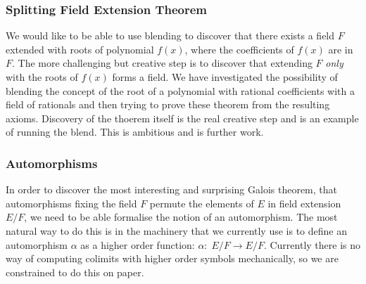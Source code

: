 \subsubsection{Splitting Field Extension Theorem}

We would like to be able to use blending to discover that there exists a
field $F$ extended with roots of polynomial $f(x)$, where the coefficients of $f(x)$ are in $F$. The more challenging but creative step is to discover that extending $F$ {\em only} with the roots of $f(x)$ forms a field. We have investigated the possibility of blending the concept of the root of a polynomial with rational coefficients with a field of rationals and then trying to prove these theorem from the resulting axioms. Discovery of the thoerem itself is the real creative step and is an example of running the blend. This is ambitious and is further work.

\subsubsection{Automorphisms}

In order to discover the most interesting and surprising Galois
theorem, that automorphisms fixing the field $F$ permute the elements
of $E$ in field extension $E/F$, we need to be able formalise the
notion of an automorphism. The most natural way to do this is in the
machinery that we currently use is to define an automorphism $\alpha$
as a higher order function: $\alpha:\; E/F \to E/F$. Currently there
is no way of computing colimits with higher order symbols
mechanically, so we are constrained to do this on paper.



